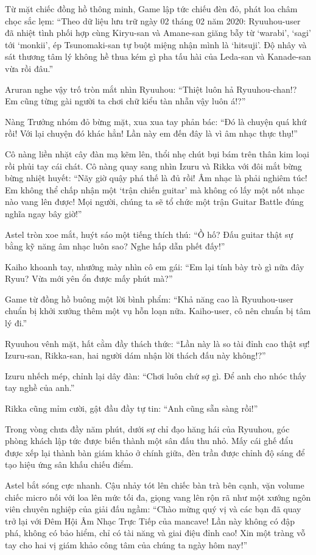 \documentclass[../main.tex]{subfiles}
\begin{document}
Từ mặt chiếc đồng hồ thông minh, Game lập tức chiếu đèn đỏ, phát loa châm chọc sắc lẹm: ``Theo dữ liệu lưu trữ ngày 02 tháng 02 năm 2020: Ryuuhou-user đã nhiệt tình phối hợp cùng Kiryu-san và Amane-san giăng bẫy từ `warabi', `sagi' tới `monkii', ép Tsunomaki-san tự buột miệng nhận mình là `hitsuji'. Độ nhây và sát thương tâm lý không hề thua kém gì pha tấu hài của Leda-san và Kanade-san vừa rồi đâu.''

Aruran nghe vậy trố tròn mắt nhìn Ryuuhou: ``Thiệt luôn hả Ryuuhou-chan!? Em cũng từng gài người ta chơi chữ kiểu tàn nhẫn vậy luôn á!?''

Nàng Trưởng nhóm đỏ bừng mặt, xua xua tay phản bác: ``Đó là chuyện quá khứ rồi! Với lại chuyện đó khác hẳn! Lần này em đến đây là vì âm nhạc thực thụ!''

Cô nàng liền nhặt cây đàn mạ kẽm lên, thổi nhẹ chút bụi bám trên thân kim loại rồi phủi tay cái chát. Cô nàng quay sang nhìn Izuru và Rikka với đôi mắt bừng bừng nhiệt huyết: ``Nãy giờ quậy phá thế là đủ rồi! Âm nhạc là phải nghiêm túc! Em không thể chấp nhận một `trận chiến guitar' mà không có lấy một nốt nhạc nào vang lên được! Mọi người, chúng ta sẽ tổ chức một trận Guitar Battle đúng nghĩa ngay bây giờ!''

Astel tròn xoe mắt, huýt sáo một tiếng thích thú: ``Ồ hố? Đấu guitar thật sự bằng kỹ năng âm nhạc luôn sao? Nghe hấp dẫn phết đấy!''

Kaiho khoanh tay, nhướng mày nhìn cô em gái: ``Em lại tính bày trò gì nữa đây Ryuu? Vừa mới yên ổn được mấy phút mà?''

Game từ đồng hồ buông một lời bình phẩm: ``Khả năng cao là Ryuuhou-user chuẩn bị khởi xướng thêm một vụ hỗn loạn nữa. Kaiho-user, cô nên chuẩn bị tâm lý đi.''

Ryuuhou vênh mặt, hất cằm đầy thách thức: ``Lần này là so tài đỉnh cao thật sự! Izuru-san, Rikka-san, hai người dám nhận lời thách đấu này không!?''

Izuru nhếch mép, chỉnh lại dây đàn: ``Chơi luôn chứ sợ gì. Để anh cho nhóc thấy tay nghề của anh.''

Rikka cũng mỉm cười, gật đầu đầy tự tin: ``Anh cũng sẵn sàng rồi!''

Trong vòng chưa đầy năm phút, dưới sự chỉ đạo hăng hái của Ryuuhou, góc phòng khách lập tức được biến thành một sân đấu thu nhỏ. Mấy cái ghế đẩu được xếp lại thành bàn giám khảo ở chính giữa, đèn trần được chỉnh độ sáng để tạo hiệu ứng sân khấu chiếu điểm.

Astel bắt sóng cực nhanh. Cậu nhảy tót lên chiếc bàn trà bên cạnh, vặn volume chiếc micro nối với loa lên mức tối đa, giọng vang lên rộn rã như một xướng ngôn viên chuyên nghiệp của giải đấu ngầm: ``Chào mừng quý vị và các bạn đã quay trở lại với Đêm Hội Âm Nhạc Trực Tiếp của mancave! Lần này không có đập phá, không có bảo hiểm, chỉ có tài năng và giai điệu đỉnh cao! Xin một tràng vỗ tay cho hai vị giám khảo công tâm của chúng ta ngày hôm nay!''
\end{document}

